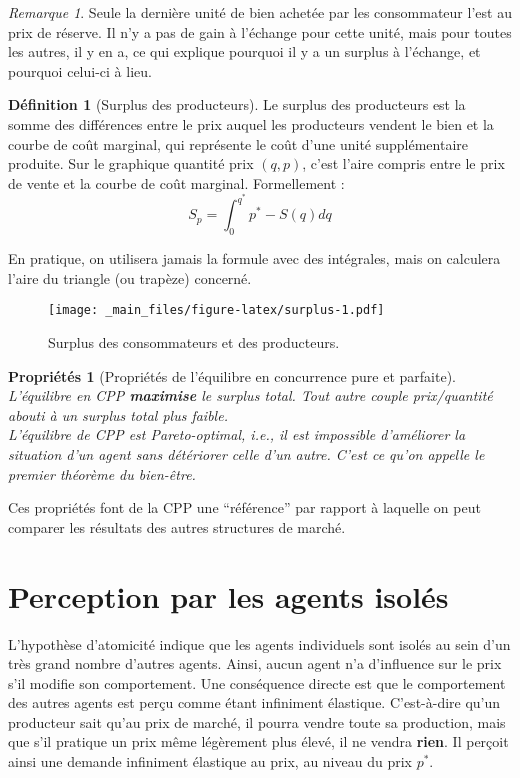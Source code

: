 \documentclass[
]{book}
\newtheorem{proposition}{Propriétés}[chapter]
\theoremstyle{definition}
\newtheorem{definition}{Définition}[chapter]
\theoremstyle{definition}
\theoremstyle{definition}
\theoremstyle{definition}
\theoremstyle{remark}
\newtheorem*{remark}{Remarque}
\begin{document}
\begin{remark}
Seule la dernière unité de bien achetée par les consommateur l'est au prix de réserve.
Il n'y a pas de gain à l'échange pour cette unité, mais pour toutes les autres, il y en a, ce qui explique pourquoi il y a un surplus à l'échange, et pourquoi celui-ci à lieu.
\end{remark}

\begin{definition}[Surplus des producteurs]
Le surplus des producteurs est la somme des différences entre le prix auquel les producteurs vendent le bien et la courbe de coût marginal, qui représente le coût d'une unité supplémentaire produite.
Sur le graphique quantité prix \((q, p)\), c'est l'aire compris entre le prix de vente et la courbe de coût marginal.
Formellement :
\[S_p=\int_0^{q^*}p^*-S(q) dq\]
\end{definition}

En pratique, on utilisera jamais la formule avec des intégrales, mais on calculera l'aire du triangle (ou trapèze) concerné.

\begin{figure}
\centering
\texttt{[image: \_main\_files/figure-latex/surplus-1.pdf]}
\caption{\label{fig:surplus}Surplus des consommateurs et des producteurs.}
\end{figure}

\begin{proposition}[Propriétés de l'équilibre en concurrence pure et parfaite]
\protect\hypertarget{prp:cppprop}{}\label{prp:cppprop}L'équilibre en CPP \textbf{maximise} le \emph{surplus total}.
Tout autre couple prix/quantité abouti à un surplus total plus faible.\\
L'équilibre de CPP est \emph{Pareto-optimal}, i.e., il est impossible d'améliorer la situation d'un agent sans détériorer celle d'un autre.
C'est ce qu'on appelle le \emph{premier théorème du bien-être}.
\end{proposition}

Ces propriétés font de la CPP une ``référence'' par rapport à laquelle on peut comparer les résultats des autres structures de marché.

\hypertarget{perception-par-les-agents-isoluxe9s}{%
\section{Perception par les agents isolés}\label{perception-par-les-agents-isoluxe9s}}

L'hypothèse d'atomicité indique que les agents individuels sont isolés au sein d'un très grand nombre d'autres agents.
Ainsi, aucun agent n'a d'influence sur le prix s'il modifie son comportement.
Une conséquence directe est que le comportement des autres agents est perçu comme étant infiniment élastique.
C'est-à-dire qu'un producteur sait qu'au prix de marché, il pourra vendre toute sa production, mais que s'il pratique un prix même légèrement plus élevé, il ne vendra \textbf{rien}.
Il perçoit ainsi une demande infiniment élastique au prix, au niveau du prix \(p^*\).
\end{document}
